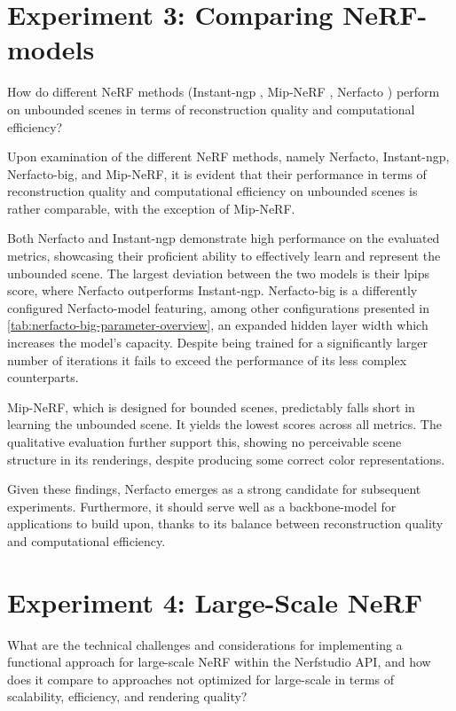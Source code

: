 \section{Experiment 3: Comparing NeRF-models}
\begin{description}[leftmargin=!,labelwidth=\widthof{RQ 1:}]
\item[\textbf{RQ 3:}] How do different NeRF methods (Instant-ngp \cite{muller_instant_2022}, Mip-NeRF \cite{barron_mip-nerf_2021}, Nerfacto \cite{tancik_nerfstudio_2023}) perform on unbounded scenes in terms of reconstruction quality and computational efficiency?
\end{description}

Upon examination of the different NeRF methods, namely Nerfacto, Instant-ngp, Nerfacto-big, and Mip-NeRF, it is evident that their performance in terms of reconstruction quality and computational efficiency on unbounded scenes is rather comparable, with the exception of Mip-NeRF.

Both Nerfacto and Instant-ngp demonstrate high performance on the evaluated metrics, showcasing their proficient ability to effectively learn and represent the unbounded scene. The largest deviation between the two models is their \acrshort{lpips} score, where Nerfacto outperforms Instant-ngp. Nerfacto-big is a differently configured Nerfacto-model featuring, among other configurations presented in \autoref{tab:nerfacto-big-parameter-overview}, an expanded hidden layer width which increases the model's capacity. Despite being trained for a significantly larger number of iterations it fails to exceed the performance of its less complex counterparts.

Mip-NeRF, which is designed for bounded scenes, predictably falls short in learning the unbounded scene. It yields the lowest scores across all metrics. The qualitative evaluation further support this, showing no perceivable scene structure in its renderings, despite producing some correct color representations.

Given these findings, Nerfacto emerges as a strong candidate for subsequent experiments. Furthermore, it should serve well as a backbone-model for applications to build upon, thanks to its balance between reconstruction quality and computational efficiency.



\section{Experiment 4: Large-Scale NeRF}
\begin{description}[leftmargin=!,labelwidth=\widthof{RQ 1:}]
\item[\textbf{RQ 4:}] What are the technical challenges and considerations for implementing a functional approach for large-scale NeRF within the Nerfstudio API, and how does it compare to approaches not optimized for large-scale in terms of scalability, efficiency, and rendering quality?
\end{description}

